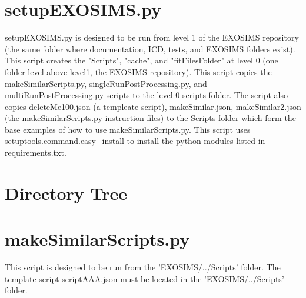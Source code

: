 \documentclass[12pt]{article}
\begin{document}
\maketitle


\section{setupEXOSIMS.py}
setupEXOSIMS.py is designed to be run from level 1 of the EXOSIMS repository (the same folder where documentation, ICD, tests, and EXOSIMS folders exist).
This script creates the "Scripts", "cache", and "fitFilesFolder"  at level 0 (one folder level above level1, the EXOSIMS repository).
This script copies the makeSimilarScripts.py, singleRunPostProcessing.py, and multiRunPostProcessing.py scripts to the level 0 scripts folder.
The script also copies deleteMe100.json (a templeate script), makeSimilar.json, makeSimilar2.json (the makeSimilarScripts.py instruction files) to the Scripts folder which form the base examples of how to use makeSimilarScripts.py. 
This script uses setuptools.command.easy\_install to install the python modules listed in requirements.txt.


\section{Directory Tree}


\section{makeSimilarScripts.py}
This script is designed to be run from the 'EXOSIMS/../Scripts' folder.
The template script scriptAAA.json must be located in the 'EXOSIMS/../Scripts' folder.
\end{document}
